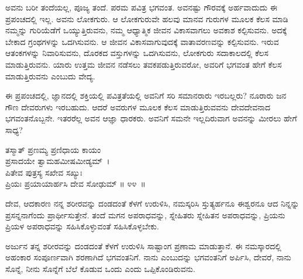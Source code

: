 \newpage

ಅವನು ಬರೀ ತಂದೆಯಲ್ಲ, ಪೂಜ್ಯ ತಂದೆ. ಪರಮ ಪವಿತ್ರ ಭಗವಂತ. ಅವನಷ್ಟು ಗೌರವಕ್ಕೆ ಅರ್ಹವಾದುದು ಈ ಪ್ರಪಂಚದಲ್ಲಿ ಇಲ್ಲ. ಅವನು ಲೋಕಗುರು. ಆ ಲೋಕಗುರುವೇ ಹಲವು ಮಾನವ ಗುರುಗಳ ಮೂಲಕ ಕೆಲಸ ಮಾಡಿ ನಮ್ಮನ್ನು ಗುರಿಯೆಡೆಗೆ ಒಯ್ಯುತ್ತಿರುವನು, ನಮ್ಮ ಆಧ್ಯಾತ್ಮಿಕ ಜೀವನ ವಿಕಾಸವಾಗಲು ಅವಕಾಶ ಕಲ್ಪಿಸುವನು. ಅದಕ್ಕೆ ಬೇಕಾದ ಗ್ರಂಥಗಳನ್ನು ಒದಗಿಸುವನು. ಆ ಜೀವನ ವಿಕಾಸವಾಗುವುದಕ್ಕೆ ವಾತಾವರಣವನ್ನು ಕಲ್ಪಿಸುವನು. ಇರುವ ಆತಂಕಗಳನ್ನು ನಿವಾರಿಸುವನು, ದೊರಕದ ವಸ್ತುಗಳನ್ನು ಒದಗಿಸುವನು, ಲೋಕಗುರು ಸದಾಕಾಲದಲ್ಲಿ ಕೆಲಸ ಮಾಡುತ್ತಿರುವನು. ಯಾರು ಉತ್ತಮ ಜೀವನ ನಡೆಸಲು ತವಕಪಡುತ್ತಿರುವರೋ, ಅವರಿಗೆ ಭಗವಂತ ಹೇಗೆ ಕೆಲಸ ಮಾಡುತ್ತಿರುವನು ಎಂಬುದು ವೇದ್ಯ.

ಈ ಪ್ರಪಂಚದಲ್ಲಿ, ಜ್ಞಾನದಲ್ಲಿ ಶಕ್ತಿಯಲ್ಲಿ ಪವಿತ್ರತೆಯಲ್ಲಿ ಅವನಿಗೆ ಸರಿ ಸಮಾನರಾರು ಇರಬಲ್ಲರು? ನೂರಾರು ಜನ ಗೌಣ ದೇವರುಗಳು ಇರಬಹುದು. ಆದರೆ ಅವರುಗಳ ಮೂಲಕ ಕೆಲಸ ಮಾಡುತ್ತಿರುವವನು ದೇವದೇವನಾದ ಭಗವಂತನೊಬ್ಬನೇ. ಇತರರೆಲ್ಲ ಅವನ ಆಜ್ಞಾ ಧಾರಕರು. ಅವನಿಗೆ ಸಮನೇ ಇಲ್ಲದಿರುವಾಗ ಅವನನ್ನು ಮೀರಲು ಹೇಗೆ ಸಾಧ್ಯ?

\begin{shloka}
ತಸ್ಮಾತ್ ಪ್ರಣಮ್ಯ ಪ್ರಣಿಧಾಯ ಕಾಯಂ \\ ಪ್ರಸಾದಯೇ ತ್ವಾಮಹಮೀಷಮೀಡ್ಯಮ್~।\\ಪಿತೇವ ಪುತ್ರಸ್ಯ ಸಖೇವ ಸಖ್ಯುಃ \\ ಪ್ರಿಯಃ ಪ್ರಯಾಯಾರ್ಹಸಿ ದೇವ ಸೋಢುಮ್ \hfill॥ ೪೪~॥
\end{shloka}

\begin{artha}
ದೇವ, ಆದಕಾರಣ ನನ್ನ ಶರೀರವನ್ನು ದಂಡದಂತೆ ಕೆಳಗೆ ಉರುಳಿಸಿ, ನಮಸ್ಕರಿಸಿ ಸ್ತುತ್ಯರ್ಹನೂ ಈಶ್ವರನೂ ಆದ ನಿನ್ನನ್ನು ಪ್ರಸನ್ನನಾಗೆಂದು ಪ್ರಾರ್ಥೀಸುತ್ತೇನೆ. ತಂದೆ ಮಗನ ಅಪರಾಧವನ್ನು, ಸ್ನೇಹಿತರು ಸ್ನೇಹಿತನ ಅಪರಾಧವನ್ನು, ಪ್ರಿಯನು ಪ್ರಿಯಳ ಅಪರಾಧವನ್ನು ಸಹಿಸಿಕೊಳ್ಳುವಂತೆ ಸಹಿಸಿಕೊಳ್ಳಬೇಕು.
\end{artha}

ಅರ್ಜುನ ತನ್ನ ಶರೀರವನ್ನು ದಂಡದಂತೆ ಕೆಳಗೆ ಉರುಳಿಸಿ ಸಾಷ್ಟಾಂಗ ಪ್ರಣಾಮ ಮಾಡುತ್ತಾನೆ. ಈ ನಮಸ್ಕಾರದಲ್ಲಿ ಅಹಂಕಾರ ಸಂಪೂರ್ಣವಾಗಿ ಶರಣಾಗಿದೆ ಭಗವಂತನಿಗೆ. ನಾನು ಎಂಬುದನ್ನು ಭಗವಂತನಿಗೆ ಅರ್ಪಿಸಿ, ದೇವರೆ, ನಾನು ಸೊನ್ನೆ, ನೀನು ಸೊನ್ನೆಗೆ ಬೆಲೆ ಕೊಡುವ ಒಂದು ಎಂದು ಒಪ್ಪಿಕೊಂಡಿರುವನು.

